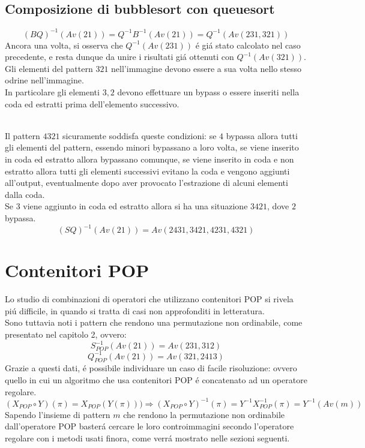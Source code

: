 \subsection*{Composizione di {bubblesort} con {queuesort}}
$$(BQ)^{-1}(Av(21))=Q^{-1}B^{-1}(Av(21))=Q^{-1}(Av(231,321))$$
Ancora una volta, si osserva che $Q^{-1}(Av(231))$ \'e gi\'a stato calcolato nel caso precedente, e resta dunque da unire i risultati gi\'a ottenuti con $Q^{-1}(Av(321))$.\\
Gli elementi del pattern $321$ nell'immagine devono essere a sua volta nello stesso odrine nell'immagine.\\
In particolare gli elementi $3,2$ devono effettuare un bypass o essere inseriti nella coda ed estratti prima dell'elemento successivo.\\\\
\begin{center}
\end{center}
Il pattern $4321$ sicuramente soddisfa queste condizioni: se $4$ bypassa allora tutti gli elementi del pattern, essendo minori bypassano a loro volta, se viene inserito in coda ed estratto allora bypassano comunque, se viene inserito in coda e non estratto allora tutti gli elementi successivi evitano la coda e vengono aggiunti all'output, eventualmente dopo aver provocato l'estrazione di alcuni elementi dalla coda.\\
Se $3$ viene aggiunto in coda ed estratto allora si ha una situazione $3421$, dove $2$ bypassa.\\
$$(SQ)^{-1}(Av(21))=Av(2431,3421,4231,4321)$$
\section*{Contenitori POP}
Lo studio di combinazioni di operatori che utilizzano contenitori POP si rivela pi\'u difficile, in quando si tratta di casi non approfonditi in letteratura.\\
Sono tuttavia noti i pattern che rendono una permutazione non ordinabile, come presentato nel capitolo 2, ovvero:
$$S_{POP}^{-1}(Av(21)) = Av(231,312)$$$$Q_{POP}^{-1}(Av(21))=Av(321,2413)$$
Grazie a questi dati, \'e possibile individuare un caso di facile risoluzione: ovvero quello in cui un algoritmo che usa contenitori POP \'e concatenato ad un operatore regolare.
$$(X_{POP}\circ{Y})(\pi)= X_{POP}(Y(\pi)))\Rightarrow(X_{POP}\circ{Y})^{-1}(\pi) = Y^{-1}X_{POP}^{-1}(\pi)=Y^{-1}(Av(m))$$
Sapendo l'insieme di pattern $m$ che rendono la permutazione non ordinabile dall'operatore POP baster\'a cercare le loro controimmagini secondo l'operatore regolare con i metodi usati finora, come verr\'a mostrato nelle sezioni seguenti.
